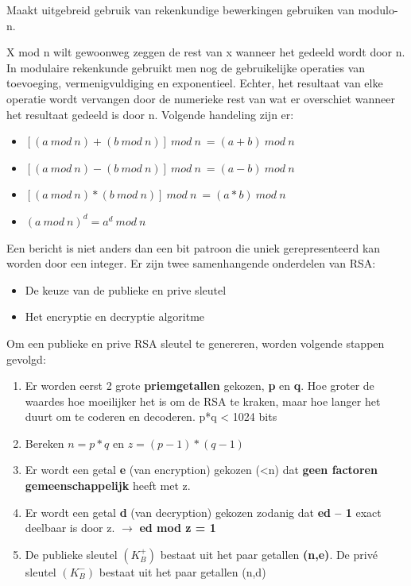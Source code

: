 
Maakt uitgebreid gebruik van rekenkundige bewerkingen gebruiken van modulo-n.

X mod n wilt gewoonweg zeggen de rest van x wanneer het gedeeld wordt door n. In modulaire rekenkunde gebruikt men nog de gebruikelijke operaties van toevoeging, vermenigvuldiging en exponentieel. Echter, het resultaat van elke operatie wordt vervangen door de numerieke rest van wat er overschiet wanneer het resultaat gedeeld is door n.
Volgende handeling zijn er:

\begin{itemize}

\item $[(a\ mod\ n)  + (b\ mod\ n)] \ mod\ n\ = (a + b)\ mod\ n$
\item $[(a\ mod\ n) - (b\ mod\ n)] \ mod\ n\ = (a - b)\ mod\ n$
\item $[(a\ mod\ n) * (b\ mod\ n)] \ mod\ n\ = (a * b)\ mod\ n$
\item $(a\ mod\ n)^d = a^d\ mod\ n$
\end{itemize}
Een bericht is niet anders dan een bit patroon die uniek gerepresenteerd kan worden door een integer. Er zijn twee samenhangende onderdelen van RSA:

\begin{itemize}
\item De keuze van de publieke en prive sleutel
\item Het encryptie en decryptie algoritme
\end{itemize}


Om een publieke en prive RSA sleutel te genereren, worden volgende stappen gevolgd:

\begin{enumerate}
\item Er worden eerst 2 grote \textbf{priemgetallen} gekozen, \textbf{p} en \textbf{q}. Hoe groter de waardes hoe moeilijker het is om de RSA te kraken, maar hoe langer het duurt om te coderen en decoderen. p*q < 1024 bits
\item Bereken $n = p*q$ en $z = (p - 1)*(q - 1)$
\item Er wordt een getal \textbf{e} (van encryption) gekozen (<n) dat \textbf{geen factoren gemeenschappelijk} heeft met z.
\item Er wordt een getal \textbf{d} (van decryption) gekozen zodanig dat \textbf{ed – 1} exact deelbaar is door z. $\rightarrow$ \textbf{ed mod z = 1}
\item De publieke sleutel $(K^+_B)$ bestaat uit het paar getallen \textbf{(n,e)}. De privé sleutel $(K^-_B)$ bestaat uit het paar getallen (n,d)
\end{enumerate}

